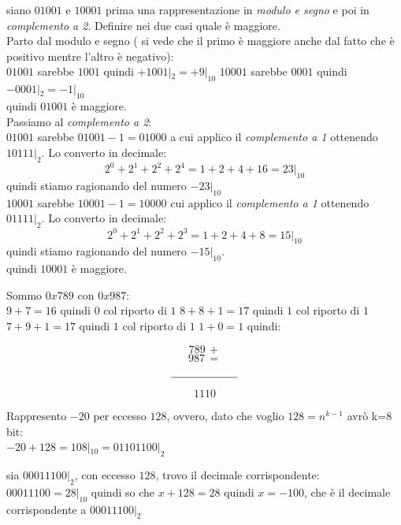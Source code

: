 \documentclass[a4paper,12pt, oneside]{book}
\begin{document}
\begin{esercizio}[???]
  siano $01001$ e $10001$ prima una rappresentazione in \textit{modulo e segno} e poi in \textit{complemento a 2}. Definire nei due casi quale è maggiore.\\
  Parto dal modulo e segno ( si vede che il primo è maggiore anche dal fatto che è positivo mentre l'altro è negativo):\\
  $01001$ sarebbe $1001$ quindi $+1001|_2=+9|_{10}$
  $10001$ sarebbe $0001$ quindi $-0001|_2=-1|_{10}$\\
  quindi $01001$ è maggiore.\\
  Passiamo al \textit{complemento a 2}:\\
  $01001$ sarebbe $01001-1=01000$ a cui applico il \textit{complemento a 1} ottenendo $10111|_2$. Lo converto in decimale:\\
  $$2^0+2^1+2^2+2^4=1+2+4+16=23|_{10}$$ quindi stiamo ragionando del numero $-23|_{10}$\\
  $10001$ sarebbe $10001-1=10000$  cui applico il \textit{complemento a 1} ottenendo $01111|_2$. Lo converto in decimale:\\
  $$2^0+2^1+2^2+2^3=1+2+4+8=15|_{10}$$ quindi stiamo ragionando del numero $-15|_{10}$.\\quindi $10001$ è maggiore.
\end{esercizio}
\begin{esercizio}
  Sommo $0x789$ con $0x987$:\\
  $9+7=16$ quindi $0$ col riporto di $1$
  $8+8+1=17$ quindi $1$ col riporto di $1$
  $7+9+1=17$ quindi $1$ col riporto di $1$
  $1+0=1$
  quindi:

  $$789\,+$$
  $$987\,=$$
  $$\rule{60pt}{.4pt}$$
  $$1110$$
\end{esercizio}
\begin{esercizio}
  Rappresento $-20$ per eccesso $128$, ovvero, dato che voglio $128=n^{k-1}$ avrò k=8 bit:\\
  $-20+128=108|_{10}=01101100|_2$
\end{esercizio}
\begin{esercizio}
  sia $00011100|_2$, con eccesso $128$, trovo il decimale corrispondente:\\
  $00011100=28|_{10}$ quindi so che $x+128=28$ quindi $x=-100$, che è il decimale corrispondente a $00011100|_2$
\end{esercizio}
\end{document}

